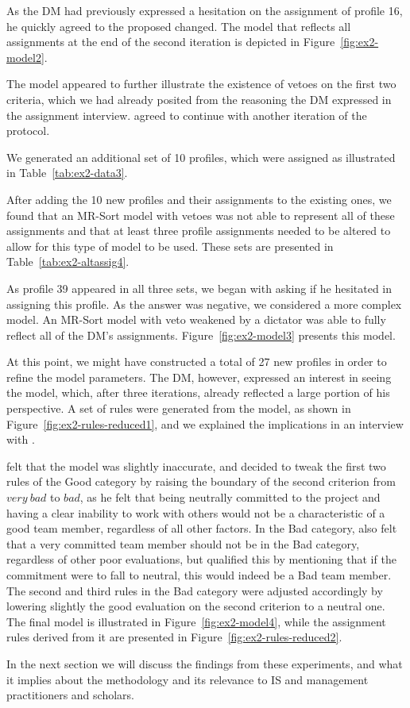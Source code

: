 As the DM had previously expressed a hesitation on the assignment of profile 16, he quickly agreed to the proposed changed. The model that reflects all assignments at the end of the second iteration is depicted in Figure~\ref{fig:ex2-model2}.



The model appeared to further illustrate the existence of vetoes on the first two criteria, which we had already posited from the reasoning the DM expressed in the assignment interview. \DB agreed to continue with another iteration of the protocol.

We generated an additional set of 10 profiles, which were assigned as illustrated in Table~\ref{tab:ex2-data3}.



After adding the 10 new profiles and their assignments to the existing ones, we found that an MR-Sort model with vetoes was not able to represent all of these assignments and that at least three profile assignments needed to be altered to allow for this type of model to be used. These sets are presented in Table~\ref{tab:ex2-altassig4}.



As profile 39 appeared in all three sets, we began with asking \DB if he hesitated in assigning this profile. As the answer was negative, we considered a more complex model. An MR-Sort model with veto weakened by a dictator was able to fully reflect all of the DM's assignments. Figure~\ref{fig:ex2-model3} presents this model.



At this point, we might have constructed a total of 27 new profiles in order to refine the model parameters. The DM, however, expressed an interest in seeing the model, which, after three iterations, already reflected a large portion of his perspective. A set of rules were generated from the model, as shown in Figure~\ref{fig:ex2-rules-reduced1}, and we explained the implications in an interview with \DB.



\DB felt that the model was slightly inaccurate, and decided to tweak the first two rules of the Good category by raising the boundary of the second criterion from $very\ bad$ to $bad$, as he felt that being neutrally committed to the project and having a clear inability to work with others would not be a characteristic of a good team member, regardless of all other factors. In the Bad category, \DB also felt that a very committed team member should not be in the Bad category, regardless of other poor evaluations, but qualified this by mentioning that if the commitment were to fall to neutral, this would indeed be a Bad team member. The second and third rules in the Bad category were adjusted accordingly by lowering slightly the good evaluation on the second criterion to a neutral one. The final model is illustrated in Figure~\ref{fig:ex2-model4}, while the assignment rules derived from it are presented in Figure~\ref{fig:ex2-rules-reduced2}.





In the next section we will discuss the findings from these experiments, and what it implies about the methodology and its relevance to IS and management practitioners and scholars.

